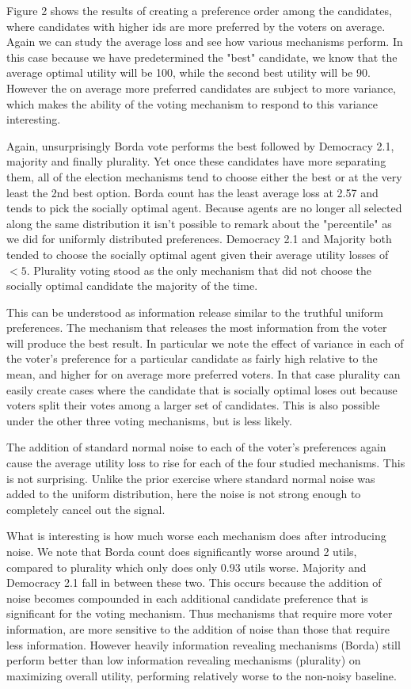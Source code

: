 \documentclass[11pt]{scrartcl}
\begin{document}
Figure 2 shows the results of creating a preference order among the candidates, where candidates with higher ids are more preferred by the voters on average. Again we can study the average loss and see how various mechanisms perform. In this case because we have predetermined the "best" candidate, we know that the average optimal utility will be 100, while the second best utility will be 90. However the on average more preferred candidates are subject to more variance, which makes the ability of the voting mechanism to respond to this variance interesting.

Again, unsurprisingly Borda vote performs the best followed by Democracy 2.1, majority and finally plurality. Yet once these candidates have more separating them, all of the election mechanisms tend to choose either the best or at the very least the 2nd best option. Borda count has the least average loss at 2.57 and tends to pick the socially optimal agent. Because agents are no longer all selected along the same distribution it isn't possible to remark about the "percentile" as we did for uniformly distributed preferences. Democracy 2.1 and Majority both tended to choose the socially optimal agent given their average utility losses of $<5$. Plurality voting stood as the only mechanism that did not choose the socially optimal candidate the majority of the time.

This can be understood as information release similar to the truthful uniform preferences. The mechanism that releases the most information from the voter will produce the best result. In particular we note the effect of variance in each of the voter's preference for a particular candidate as fairly high relative to the mean, and higher for on average more preferred voters. In that case plurality can easily create cases where the candidate that is socially optimal loses out because voters split their votes among a larger set of candidates. This is also possible under the other three voting mechanisms, but is less likely.

The addition of standard normal noise to each of the voter's preferences again cause the average utility loss to rise for each of the four studied mechanisms. This is not surprising. Unlike the prior exercise where standard normal noise was added to the uniform distribution, here the noise is not strong enough to completely cancel out the signal.

What is interesting is how much worse each mechanism does after introducing noise. We note that Borda count does significantly worse around 2 utils, compared to plurality which only does only 0.93 utils worse. Majority and Democracy 2.1 fall in between these two. This occurs because the addition of noise becomes compounded in each additional candidate preference that is significant for the voting mechanism. Thus mechanisms that require more voter information, are more sensitive to the addition of noise than those that require less information. However heavily information revealing mechanisms (Borda) still perform better than low information revealing mechanisms (plurality) on maximizing overall utility, performing relatively worse to the non-noisy baseline.
\end{document}
